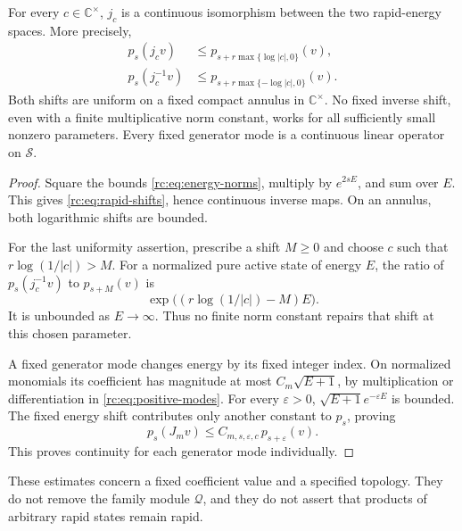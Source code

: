 \begin{theorem}
\label{rc:thm:rapid}
For every \(c\in\mathbb C^\times\), \(j_c\) is a continuous
isomorphism between the two rapid-energy spaces.  More
precisely,
\begin{equation}\label{rc:eq:rapid-shifts}
\begin{aligned}
 p_s(j_cv)&\leq
 p_{s+r\max\{\log|c|,0\}}(v),\\
 p_s(j_c^{-1}v)&\leq
 p_{s+r\max\{-\log|c|,0\}}(v).
\end{aligned}
\end{equation}
Both shifts are uniform on a fixed compact annulus in
\(\mathbb C^\times\).  No fixed inverse shift, even with
a finite multiplicative norm constant, works for all
sufficiently small nonzero parameters.
Every fixed generator mode is a continuous linear
operator on \(\mathscr S\).
\end{theorem}
\begin{proof}
Square the bounds \eqref{rc:eq:energy-norms}, multiply
by \(e^{2sE}\), and sum over \(E\).  This gives
\eqref{rc:eq:rapid-shifts}, hence continuous inverse maps.
On an annulus, both logarithmic shifts are bounded.

For the last uniformity assertion, prescribe a shift
\(M\geq0\) and choose \(c\) such that
\(r\log(1/|c|)>M\).
For a normalized pure active state of energy \(E\),
the ratio of \(p_s(j_c^{-1}v)\) to \(p_{s+M}(v)\) is
\[
 \exp\bigl((r\log(1/|c|)-M)E\bigr).
\]
It is unbounded as \(E\to\infty\).  Thus no finite norm
constant repairs that shift at this chosen parameter.

A fixed generator mode changes energy by its fixed
integer index.  On normalized monomials its coefficient
has magnitude at most \(C_m\sqrt{E+1}\), by multiplication
or differentiation in \eqref{rc:eq:positive-modes}.
For every \(\varepsilon>0\),
\(\sqrt{E+1}e^{-\varepsilon E}\) is bounded.
The fixed energy shift contributes only another constant
to \(p_s\), proving
\[
 p_s(J_mv)\leq C_{m,s,\varepsilon,c}\,
                    p_{s+\varepsilon}(v).
\]
This proves continuity for each generator mode individually.
\end{proof}

These estimates concern a fixed coefficient value and a
specified topology.  They do not remove the family module
\(\mathcal Q\), and they do not assert that products of
arbitrary rapid states remain rapid.

